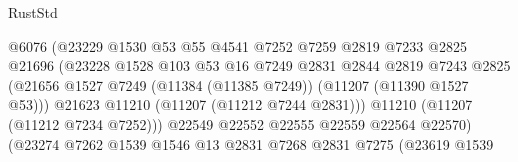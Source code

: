 \begin{lexlean}{RustStd}
\begin{coremodule}
                                          @6076
                                          (@23229
                                            @1530
                                            @53
                                            @55
                                            @4541
                                            @7252
                                            @7259
                                            @2819
                                            @7233
                                            @2825
                                            @21696
                                            (@23228
                                              @1528
                                              @103
                                              @53
                                              @16
                                              @7249
                                              @2831
                                              @2844
                                              @2819
                                              @7243
                                              @2825
                                              (@21656
                                                @1527
                                                @7249
                                                (@11384 (@11385 @7249))
                                                (@11207 (@11390 @1527 @53)))
                                              @21623
                                              @11210
                                              (@11207 (@11212 @7244 @2831)))
                                            @11210
                                            (@11207 (@11212 @7234 @7252)))
                                          @22549
                                          @22552
                                          @22555
                                          @22559
                                          @22564
                                          @22570)
                                        (@23274
                                          @7262
                                          @1539
                                          @1546
                                          @13
                                          @2831
                                          @7268
                                          @2831
                                          @7275
                                          (@23619
                                            @1539

\end{coremodule}
\end{lexlean}
